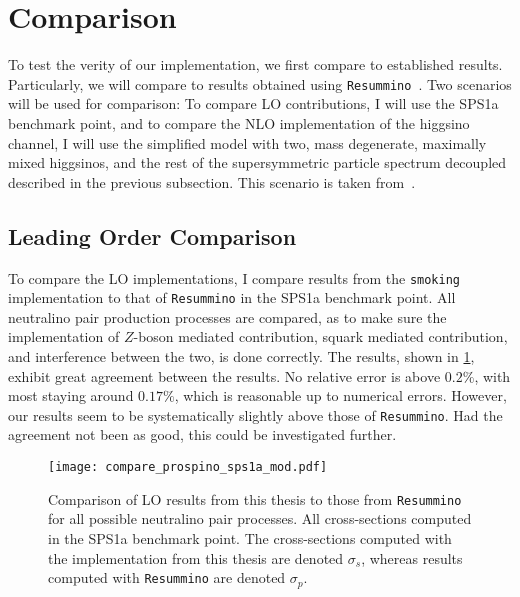 \documentclass[../main.tex]{subfiles}
\begin{document}
\section{Comparison}
\label{res:sec:comparison}
To test the verity of our implementation, we first compare to established results.
Particularly, we will compare to results obtained using \verb|Resummino|~\cite{Resummino}.
Two scenarios will be used for comparison:
To compare LO contributions, I will use the SPS1a~\cite{sps1a} benchmark point, and to compare the NLO implementation of the higgsino channel, I will use the simplified model with two, mass degenerate, maximally mixed higgsinos, and the rest of the supersymmetric particle spectrum decoupled described in the previous subsection.
This scenario is taken from~\cite{SUSYxsecWG}.



\subsection{Leading Order Comparison}
To compare the LO implementations, I compare results from the \verb|smoking| implementation to that of \verb|Resummino| in the SPS1a benchmark point.
All neutralino pair production processes are compared, as to make sure the implementation of \(Z\)-boson mediated contribution, squark mediated contribution, and interference between the two, is done correctly.
The results, shown in \cref{res:fig:sps1a_comparison}, exhibit great agreement between the results.
No relative error is above \(0.2\%\), with most staying around \(0.17\%\), which is reasonable up to numerical errors.
However, our results seem to be systematically slightly above those of \verb|Resummino|.
Had the agreement not been as good, this could be investigated further.

\begin{figure}[ht!]
  \centering
  \texttt{[image: compare\_prospino\_sps1a\_mod.pdf]}
  \caption{Comparison of LO results from this thesis to those from \texttt{Resummino} for all possible neutralino pair processes.
    All cross-sections computed in the SPS1a benchmark point.
    The cross-sections computed with the implementation from this thesis are denoted \(\sigma_s\), whereas results computed with \texttt{Resummino} are denoted \(\sigma_p\).}
  \label{res:fig:sps1a_comparison}
\end{figure}
\end{document}

